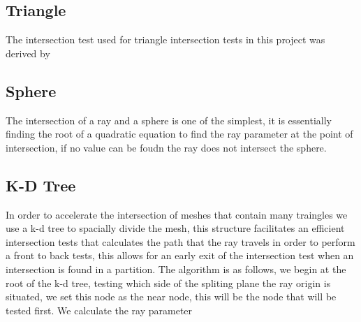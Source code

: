 \subsection{Triangle}
The intersection test used for triangle intersection tests in this project was derived by 
\subsection{Sphere}
The intersection of a ray and a sphere is one of the simplest, it is essentially finding the root of a quadratic equation to
find the ray parameter at the point of intersection, if no value can be foudn the ray does not intersect the sphere.
\subsection{K-D Tree}
In order to accelerate the intersection of meshes that contain many traingles we use a k-d tree to spacially divide the mesh,
this structure facilitates an efficient intersection tests that calculates the path that the ray travels in order to perform
a front to back tests, this allows for an early exit of the intersection test when an intersection is found in a partition.
The algorithm is as follows, we begin at the root of the k-d tree, testing which side of the spliting plane the ray origin
is situated, we set this node as the near node, this will be the node that will be tested first. We calculate the ray parameter


